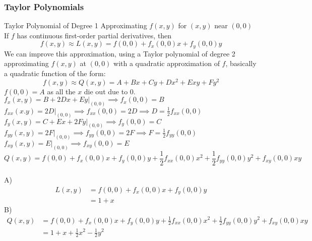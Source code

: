 \documentclass{article}
\begin{document}
\subsubsection{Taylor Polynomials}
Taylor Polynomial of Degree 1 Approximating $f(x, y)$ for $(x, y)$ near $(0,0)$ If $f$ has continuous first-order partial derivatives, then
$$ f(x, y) \approx L(x, y)= f(0,0) + f_x (0,0) x + f_y (0,0) y $$
We can improve this approximation, using a Taylor polynomial of degree 2 approximating $f(x, y)$ at $(0,0)$ with a quadratic approximation of $f$, basically a quadratic function of the form:
$$ f(x, y) \approx Q(x, y)=A+B x+C y+D x^2+E x y+F y^2 $$
$f(0,0) = A$ as all the $x$ die out due to 0. \\
$f_x (x,y) = B +2D x +Ey |_{(0,0)} \implies f_x (0,0) = B$ \\
$f_{xx} (x.y) = 2D|_{(0,0)} \implies f_{xx} (0,0) =2D \implies D = \frac{1}{2} f_{xx} (0,0)$ \\
$f_y (x,y) = C +Ex +2Fy|_{(0,0)} \implies f_y (0,0) = C$ \\
$ f_{yy} (x,y) = 2F|_{(0,0)} \implies f_{yy} (0,0) = 2F \implies F = \frac{1}{2} f_{yy} (0,0)$ \\
$f_{xy} (x,y) = E|_{(0,0)} \implies f_{xy} (0,0) = E$ 
$$ \boxed{Q (x,y) = f(0,0) + f_x (0,0) x + f_y (0,0) y + \frac{1}{2} f_{xx} (0,0) x^2 + \frac{1}{2} f_{yy} (0,0) y^2 + f_{xy} (0,0) xy}$$
\sol
\\A)
\begin{align*}
L(x,y) &= f(0,0) + f_x (0,0) x + f_y (0,0) y\\
&= 1 + x
\end{align*}
B)
\begin{align*}
Q (x,y) &= f(0,0) + f_x (0,0) x + f_y (0,0) y + \frac{1}{2} f_{xx} (0,0) x^2 + \frac{1}{2} f_{yy} (0,0) y^2 + f_{xy} (0,0) xy\\
&= 1 + x + \frac{1}{2} x^2 - \frac{1}{2} y^2
\end{align*}

\newpage
\end{document}
